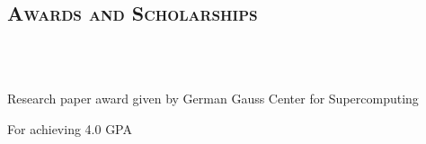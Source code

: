 \begin{resume}
	
	\section{\textsc{Awards and Scholarships}}
	
	\begin{formatb}
		\\
		\body\\
	\end{formatb}

  \begin{position}
    Research paper award given by German Gauss Center for Supercomputing
  \end{position}

	
	
	
	
	
	\begin{position}
		For achieving 4.0 GPA
	\end{position}
	



\end{resume}
